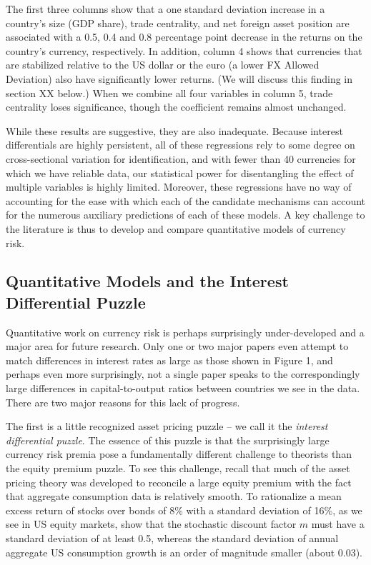 \documentclass{ar-1col}
\begin{document}
The first three columns show that a one standard deviation increase in a country's size (GDP share), trade centrality, and net foreign asset position are associated with a 0.5, 0.4 and 0.8 percentage point decrease in the returns on the country's currency, respectively. In addition, column 4 shows that currencies that are stabilized relative to the US dollar or the euro (a lower FX Allowed Deviation) also have significantly lower returns. (We will discuss this finding in section XX below.) When we combine all four variables in column 5, trade centrality loses significance, though the coefficient remains almost unchanged.

While these results are suggestive, they are also inadequate. Because interest differentials are highly persistent, all of these regressions rely to some degree on cross-sectional variation for identification, and with fewer than 40 currencies for which we have reliable data, our statistical power for disentangling the effect of multiple variables is highly limited. Moreover, these regressions have no way of accounting for the ease with which each of the candidate mechanisms can account for the numerous auxiliary predictions of each of these models. A key challenge to the literature is thus to develop and compare quantitative models of currency risk.


\subsection{Quantitative Models and the Interest Differential Puzzle}

Quantitative work on currency risk is perhaps surprisingly under-developed and a major area for future research. Only one or two major papers even attempt to match differences in interest rates as large as those shown in Figure 1, and perhaps even more surprisingly, not a single paper speaks to the correspondingly large differences in capital-to-output ratios between countries we see in the data. There are two major reasons for this lack of progress.

The first is a little recognized asset pricing puzzle -- we call it the \textit{interest differential puzzle}. The essence of this puzzle is that the surprisingly large currency risk premia pose a fundamentally different challenge to theorists than the equity premium puzzle. To see this challenge, recall that much of the asset pricing theory was developed to reconcile a large equity premium with the fact that aggregate consumption data is relatively smooth. To rationalize a mean excess return of stocks over bonds of 8\% with a standard deviation of 16\%, as we see in US equity markets, \citet{HansenJagannathan1991} show that the stochastic discount factor $m$ must have a standard deviation of at least 0.5, whereas the standard deviation of annual aggregate US consumption growth is an order of magnitude smaller (about 0.03).  
\end{document}

